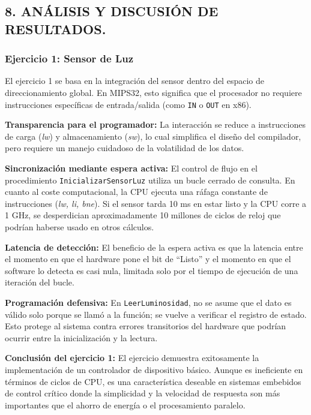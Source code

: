 \documentclass[12pt]{article}
\begin{document}
\subsection*{8. ANÁLISIS Y DISCUSIÓN DE RESULTADOS.}

\subsubsection*{Ejercicio 1: Sensor de Luz}

El ejercicio 1 se basa en la integración del sensor dentro del espacio de direccionamiento global. En MIPS32, esto significa que el procesador no requiere instrucciones específicas de entrada/salida (como \texttt{IN} o \texttt{OUT} en x86). 

\textbf{Transparencia para el programador:} La interacción se reduce a instrucciones de carga (\textit{lw}) y almacenamiento (\textit{sw}), lo cual simplifica el diseño del compilador, pero requiere un manejo cuidadoso de la volatilidad de los datos.

\textbf{Sincronización mediante espera activa:} El control de flujo en el procedimiento \texttt{InicializarSensorLuz} utiliza un bucle cerrado de consulta. En cuanto al coste computacional, la CPU ejecuta una ráfaga constante de instrucciones (\textit{lw, li, bne}). Si el sensor tarda 10 ms en estar listo y la CPU corre a 1 GHz, se desperdician aproximadamente 10 millones de ciclos de reloj que podrían haberse usado en otros cálculos.

\textbf{Latencia de detección:} El beneficio de la espera activa es que la latencia entre el momento en que el hardware pone el bit de ``Listo'' y el momento en que el software lo detecta es casi nula, limitada solo por el tiempo de ejecución de una iteración del bucle.

\textbf{Programación defensiva:} En \texttt{LeerLuminosidad}, no se asume que el dato es válido solo porque se llamó a la función; se vuelve a verificar el registro de estado. Esto protege al sistema contra errores transitorios del hardware que podrían ocurrir entre la inicialización y la lectura.

\textbf{Conclusión del ejercicio 1:} El ejercicio demuestra exitosamente la implementación de un controlador de dispositivo básico. Aunque es ineficiente en términos de ciclos de CPU, es una característica deseable en sistemas embebidos de control crítico donde la simplicidad y la velocidad de respuesta son más importantes que el ahorro de energía o el procesamiento paralelo.
\end{document}
